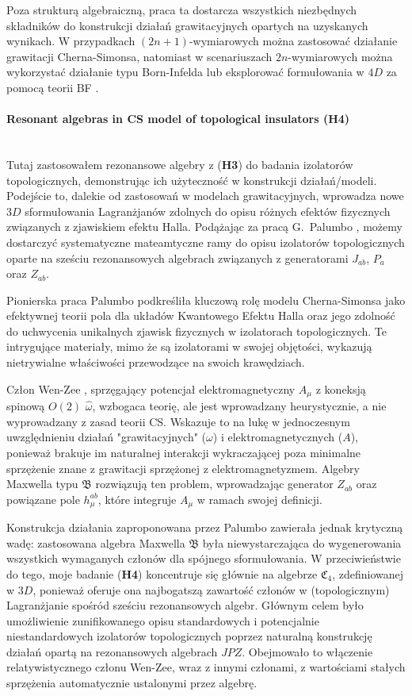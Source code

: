 \documentclass[12pt,a4paper]{article}
\newcommand{\myparagraph}[1]{\paragraph{#1}\mbox{}\\}
\begin{document}
Poza strukturą algebraiczną, praca ta dostarcza wszystkich niezbędnych składników do konstrukcji działań grawitacyjnych opartych na uzyskanych wynikach. W przypadkach $(2n+1)$-wymiarowych można zastosować działanie grawitacji Cherna-Simonsa, natomiast w scenariuszach $2n$-wymiarowych można wykorzystać działanie typu Born-Infelda \cite{Concha:2014vka} lub eksplorować formułowania w $4D$ za pomocą teorii BF \cite{Durka:2012wd, Durka:2011gm}.


\myparagraph{Resonant algebras in CS model of topological insulators (H4)} 

Tutaj zastosowałem rezonansowe algebry z (\textbf{H3}) do badania izolatorów topologicznych, demonstrując ich użyteczność w konstrukcji działań/modeli. Podejście to, dalekie od zastosowań w modelach grawitacyjnych, wprowadza nowe $3D$ sformułowania Lagranżjanów zdolnych do opisu różnych efektów fizycznych związanych z zjawiskiem efektu Halla. Podążając za pracą G.~Palumbo \cite{Palumbo:2016nku}, możemy dostarczyć systematyczne mateamtyczne ramy do opisu izolatorów topologicznych oparte na sześciu rezonansowych algebrach związanych z generatorami $J_{ab}$, $P_a$ oraz $Z_{ab}$.

Pionierska praca Palumbo podkreśliła kluczową rolę modelu Cherna-Simonsa jako efektywnej teorii pola dla układów Kwantowego Efektu Halla oraz jego zdolność do uchwycenia unikalnych zjawisk fizycznych w izolatorach topologicznych. Te intrygujące materiały, mimo że są izolatorami w swojej objętości, wykazują nietrywialne właściwości przewodzące na swoich krawędziach.

Człon Wen-Zee \cite{Wen:1992ej}, sprzęgający potencjał elektromagnetyczny $A_\mu$ z koneksją spinową $O(2)$ $\widehat{\omega}$, wzbogaca teorię, ale jest wprowadzany heurystycznie, a nie wyprowadzany z zasad teorii CS. Wskazuje to na lukę w jednoczesnym uwzględnieniu działań "grawitacyjnych" ($\omega$) i elektromagnetycznych ($A$), ponieważ brakuje im naturalnej interakcji wykraczającej poza minimalne sprzężenie znane z grawitacji sprzężonej z elektromagnetyzmem. Algebry Maxwella typu $\mathfrak{B}$ rozwiązują ten problem, wprowadzając generator $Z_{ab}$ oraz powiązane pole $h^{ab}_\mu$, które integruje $A_\mu$ w ramach swojej definicji.

Konstrukcja działania zaproponowana przez Palumbo \cite{Palumbo:2016nku} zawierała jednak krytyczną wadę: zastosowana algebra Maxwella $\mathfrak{B}$ była niewystarczająca do wygenerowania wszystkich wymaganych członów dla spójnego sformułowania. W przeciwieństwie do tego, moje badanie (\textbf{H4}) koncentruje się głównie na algebrze $\mathfrak{C}_4$, zdefiniowanej w $3D$, ponieważ oferuje ona najbogatszą zawartość członów w (topologicznym) Lagranżjanie spośród sześciu rezonansowych algebr. Głównym celem było umożliwienie zunifikowanego opisu standardowych i potencjalnie niestandardowych izolatorów topologicznych poprzez naturalną konstrukcję działań opartą na rezonansowych algebrach $JPZ$. Obejmowało to włączenie relatywistycznego członu Wen-Zee, wraz z innymi członami, z wartościami stałych sprzężenia automatycznie ustalonymi przez algebrę.
\end{document}
